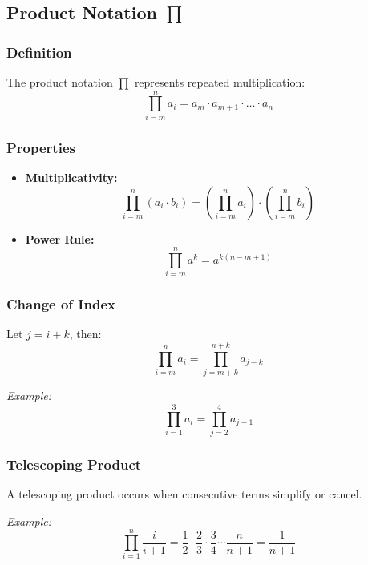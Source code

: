 \subsection{Product Notation \texorpdfstring{$\prod$}{∏}}

\subsubsection*{Definition}

The product notation $\prod$ represents repeated multiplication:
\[
\prod_{i = m}^{n} a_i = a_m \cdot a_{m+1} \cdot \dots \cdot a_n
\]

\subsubsection*{Properties}

\begin{itemize}[label=$-$]
    \item \textbf{Multiplicativity:}
    \[
    \prod_{i = m}^{n} (a_i \cdot b_i) = \left( \prod_{i = m}^{n} a_i \right) \cdot \left( \prod_{i = m}^{n} b_i \right)
    \]
    \item \textbf{Power Rule:}
    \[
    \prod_{i = m}^{n} a^k = a^{k(n - m + 1)}
    \]
\end{itemize}

\subsubsection*{Change of Index}

Let $j = i + k$, then:
\[
\prod_{i = m}^{n} a_i = \prod_{j = m + k}^{n + k} a_{j - k}
\]

\textit{Example:}
\[
\prod_{i = 1}^{3} a_i = \prod_{j = 2}^{4} a_{j - 1}
\]

\subsubsection*{Telescoping Product}

A telescoping product occurs when consecutive terms simplify or cancel.

\textit{Example:}
\[
\prod_{i = 1}^{n} \frac{i}{i+1} = \frac{1}{2} \cdot \frac{2}{3} \cdot \frac{3}{4} \cdots \frac{n}{n+1} = \frac{1}{n+1}
\]

\newpage
